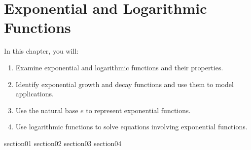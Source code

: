 \chapter{Exponential and Logarithmic Functions}

In this chapter, you will:
\begin{enumerate}
    \item Examine exponential and logarithmic functions and their properties.
    \item Identify exponential growth and decay functions and use them to model applications.
    \item Use the natural base \( e \) to represent exponential functions.
    \item Use logarithmic functions to solve equations involving exponential functions.
\end{enumerate}


{section01}
{section02}
{section03}
{section04}
